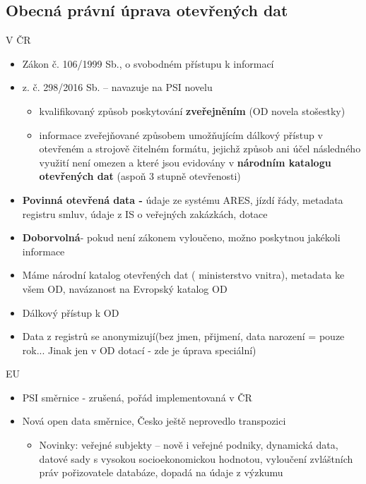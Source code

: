 \subsection{Obecná právní úprava otevřených dat}
V ČR
\begin{itemize}
    \item Zákon č. 106/1999 Sb., o svobodném přístupu k informací
    \item {} z. č. 298/2016 Sb. – navazuje na PSI novelu
    \begin{itemize}
        \item kvalifikovaný způsob poskytování \textbf{zveřejněním} (OD novela stošestky)
    \item informace zveřejňované způsobem umožňujícím dálkový přístup v otevřeném
a strojově čitelném formátu, jejichž způsob ani účel následného využití není omezen
a které jsou evidovány v \textbf{národním katalogu otevřených dat} (aspoň 3 stupně otevřenosti)
    \end{itemize}
    \item \textbf{Povinná otevřená data - }údaje ze systému ARES, jízdí řády, metadata registru smluv, údaje z IS o veřejných zakázkách, dotace
    \item \textbf{Doborvolná}- pokud není zákonem vyloučeno, možno poskytnou jakékoli informace
    \item Máme národní katalog otevřených dat ( ministerstvo vnitra), metadata ke všem OD, navázanost na Evropský katalog OD
    \item Dálkový přístup k OD
    \item Data z registrů se anonymizují(bez jmen, přijmení, data narození = pouze rok... Jinak jen v OD dotací - zde je úprava speciální)
\end{itemize}
EU
\begin{itemize}
    \item PSI směrnice - zrušená, pořád implementovaná v ČR
    \item Nová open data směrnice, Česko ještě neprovedlo transpozici
    \begin{itemize}
        \item Novinky: veřejné subjekty – nově i veřejné podniky, dynamická data, datové sady
s vysokou socioekonomickou hodnotou, vyloučení zvláštních práv pořizovatele
databáze, dopadá na údaje z výzkumu
    \end{itemize}
\end{itemize}
